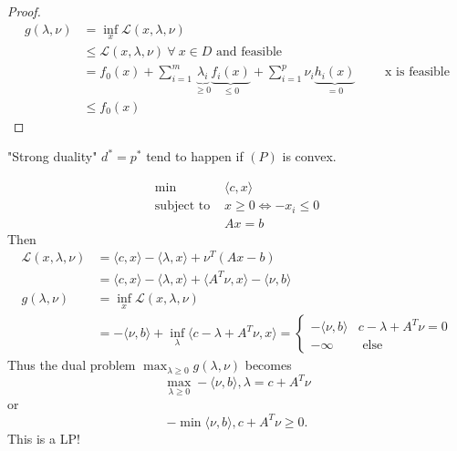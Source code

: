 \documentclass[class=article,crop=false]{standalone}
\begin{document}
\begin{proof}
\begin{align*}
	g(\lambda,\nu) &= \inf_{x} \mathscr{L}(x, \lambda,\nu) \\
		       &\leq \mathscr{L}(x, \lambda, \nu)  \ \forall \ x \in D \text{ and feasible} \\
		       &= f_0(x) + \sum_{ i= 1}^{ m} \underbrace{\lambda_i}_{\geq 0} \underbrace{f_i(x)}_{\leq 0}+ \sum_{ i= 1}^{ p} \nu_i \underbrace{h_i(x)}_{=0} \qquad  \text{ x is feasible}  \\
		       &\leq f_0(x)
\end{align*}
\end{proof}
\begin{remark}
	"Strong duality" $ d^* =p^* $ tend to happen if $ (P)$ is convex.
\end{remark}
\begin{eg}[dual of a LP]
\begin{align*}
\min\ & \langle c,x \rangle \\
\text{subject to } &x\geq 0 \iff -x_i \leq 0\\
&Ax=b
\end{align*}
Then
\begin{align*}
	\mathscr{L}(x,\lambda,\nu) &= \langle c,x \rangle - \langle \lambda,x \rangle + \nu^{T} (Ax-b)\\
	&= \langle c,x \rangle - \langle \lambda,x \rangle + \langle A^{T} \nu,x \rangle - \langle \nu,b \rangle \\
	g(\lambda,\nu) &= \inf_x \mathscr{L}(x, \lambda,\nu)  \\
	&= -\langle \nu,b \rangle + \inf_{\lambda} \langle c-\lambda+ A^{T}\nu,x \rangle =
	\begin{cases}
		-\langle \nu,b \rangle &c-\lambda+A^{T} \nu = 0 \\
		-\infty & \text{ else} 
	\end{cases}
\end{align*}
Thus the dual problem $ \max_{\lambda\geq 0} g(\lambda,\nu)$ becomes
\[
\max_{\lambda\geq 0} - \langle \nu,b \rangle, \lambda= c+A^{T} \nu
\] 
or
\[
-\min\langle \nu,b \rangle, c+A^{T} \nu \geq 0
.\]
This is a LP!
\end{eg}
\end{document}
